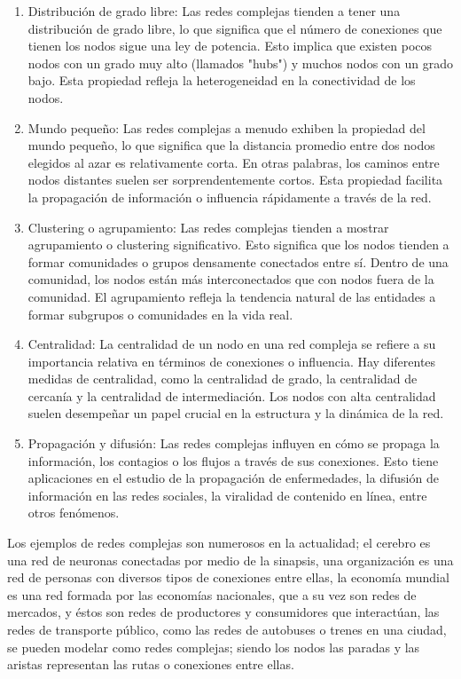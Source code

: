 \begin{enumerate}
    \item Distribución de grado libre: Las redes complejas tienden a tener una distribución de grado 
    libre, lo que significa que el número de conexiones que tienen los nodos sigue una ley de potencia. 
    Esto implica que existen pocos nodos con un grado muy alto (llamados "hubs") y muchos nodos con un 
    grado bajo. Esta propiedad refleja la heterogeneidad en la conectividad de los nodos.
    \item Mundo pequeño: Las redes complejas a menudo exhiben la propiedad del mundo pequeño, lo que 
    significa que la distancia promedio entre dos nodos elegidos al azar es relativamente corta. En 
    otras palabras, los caminos entre nodos distantes suelen ser sorprendentemente cortos. Esta propiedad 
    facilita la propagación de información o influencia rápidamente a través de la red.
    \item Clustering o agrupamiento: Las redes complejas tienden a mostrar agrupamiento o clustering significativo.
    Esto significa que los nodos tienden a formar comunidades o grupos densamente conectados entre sí. Dentro 
    de una comunidad, los nodos están más interconectados que con nodos fuera de la comunidad. El agrupamiento 
    refleja la tendencia natural de las entidades a formar subgrupos o comunidades en la vida real.
    \item Centralidad: La centralidad de un nodo en una red compleja se refiere a su importancia relativa 
    en términos de conexiones o influencia. Hay diferentes medidas de centralidad, como la centralidad de 
    grado, la centralidad de cercanía y la centralidad de intermediación. Los nodos con alta centralidad 
    suelen desempeñar un papel crucial en la estructura y la dinámica de la red.
    \item Propagación y difusión: Las redes complejas influyen en cómo se propaga la información, los 
    contagios o los flujos a través de sus conexiones. Esto tiene aplicaciones en el estudio de la propagación 
    de enfermedades, la difusión de información en las redes sociales, la viralidad de contenido en línea, 
    entre otros fenómenos.
\end{enumerate}

Los ejemplos de redes complejas son numerosos en la actualidad; el cerebro es una red de neuronas
conectadas por medio de la sinapsis, una organización es una red de personas con diversos
tipos de conexiones entre ellas, la economía mundial es una red formada por las economías
nacionales, que a su vez son redes de mercados, y éstos son redes de productores y consumidores
que interactúan, las redes de transporte público, como las redes de autobuses o trenes en una ciudad, 
se pueden modelar como redes complejas; siendo los nodos las paradas y las aristas representan las 
rutas o conexiones entre ellas.

